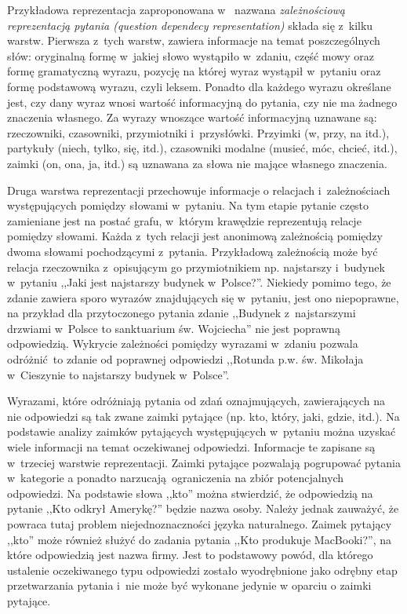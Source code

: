\documentclass[a4paper, twoside, 12pt]{report}
\begin{document}
            Przykładowa
            reprezentacja zaproponowana w~\cite{PASZKA}
            nazwana \emph{zależnościową reprezentacją pytania (question dependecy representation)} składa się z~kilku
            warstw. Pierwsza z~tych warstw, zawiera informacje na temat poszczególnych słów: oryginalną formę w~jakiej
            słowo wystąpiło w~zdaniu, część mowy oraz formę gramatyczną wyrazu, pozycję na której wyraz wystąpił w~pytaniu
            oraz formę podstawową wyrazu, czyli leksem. Ponadto dla każdego wyrazu określane jest, czy dany wyraz wnosi
            wartość informacyjną do pytania, czy nie ma żadnego znaczenia własnego. Za wyrazy wnoszące wartość informacyjną
            uznawane są: rzeczowniki, czasowniki, przymiotniki i~przysłówki. Przyimki (w, przy, na itd.),
            partykuły (niech, tylko, się, itd.), czasowniki modalne (musieć, móc, chcieć, itd.), zaimki (on, ona, ja, itd.)
            są uznawana za słowa nie mające własnego znaczenia.

            Druga warstwa reprezentacji przechowuje informacje o relacjach i~zależnościach występujących pomiędzy
            słowami w~pytaniu. Na tym etapie pytanie często zamieniane jest na postać grafu, w~którym krawędzie reprezentują
            relacje pomiędzy słowami. Każda z~tych relacji jest anonimową zależnością pomiędzy dwoma słowami pochodzącymi
            z~pytania. Przykładową zależnością może być relacja rzeczownika z~opisującym go przymiotnikiem np. najstarszy
            i~budynek w~pytaniu ,,Jaki jest najstarszy budynek w~Polsce?''. Niekiedy pomimo tego, że zdanie zawiera
            sporo wyrazów znajdujących się w~pytaniu, jest ono niepoprawne, na przykład dla przytoczonego pytania
            zdanie ,,Budynek z~najstarszymi drzwiami w~Polsce to sanktuarium św. Wojciecha'' nie jest poprawną odpowiedzią.
            Wykrycie zależności pomiędzy wyrazami w~zdaniu pozwala odróżnić to zdanie od poprawnej odpowiedzi ,,Rotunda
            p.w. św. Mikołaja w~Cieszynie to najstarszy budynek w~Polsce''.

            Wyrazami, które odróżniają pytania od zdań oznajmujących, zawierających na nie odpowiedzi są tak zwane zaimki
            pytające (np. kto, który, jaki, gdzie, itd.). Na podstawie analizy zaimków pytających występujących w~pytaniu
            można uzyskać wiele informacji na temat oczekiwanej odpowiedzi. Informacje te zapisane są w~trzeciej warstwie
            reprezentacji. Zaimki pytające pozwalają pogrupować pytania w~kategorie a ponadto narzucają ograniczenia
            na zbiór potencjalnych odpowiedzi. Na podstawie słowa ,,kto'' można stwierdzić, że odpowiedzią na pytanie
            ,,Kto odkrył Amerykę?'' będzie nazwa osoby. Należy jednak zauważyć, że powraca tutaj problem niejednoznaczności
            języka naturalnego. Zaimek pytający ,,kto'' może również służyć do zadania pytania ,,Kto produkuje MacBooki?'',
            na które odpowiedzią jest nazwa firmy. Jest to podstawowy powód, dla którego ustalenie oczekiwanego typu
            odpowiedzi zostało wyodrębnione jako odrębny etap przetwarzania pytania i~nie może być wykonane jedynie w
            oparciu o zaimki pytające.
\end{document}
